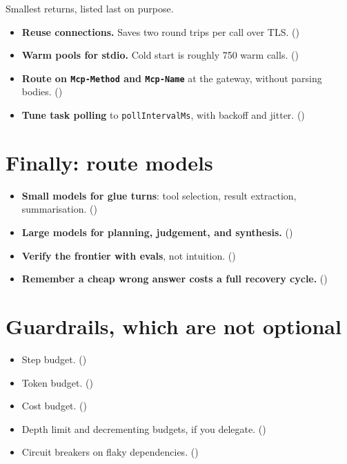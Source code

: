 Smallest returns, listed last on purpose.

\begin{itemize}[leftmargin=1.6em, itemsep=3pt]
\item[$\square$] \textbf{Reuse connections.} Saves two round trips per call over
TLS. ()
\item[$\square$] \textbf{Warm pools for stdio.} Cold start is roughly 750 warm
calls. ()
\item[$\square$] \textbf{Route on \texttt{Mcp-Method} and \texttt{Mcp-Name}} at
the gateway, without parsing bodies. ()
\item[$\square$] \textbf{Tune task polling} to \texttt{pollIntervalMs}, with
backoff and jitter. ()
\end{itemize}

\section{Finally: route models}

\begin{itemize}[leftmargin=1.6em, itemsep=3pt]
\item[$\square$] \textbf{Small models for glue turns}: tool selection, result
extraction, summarisation. ()
\item[$\square$] \textbf{Large models for planning, judgement, and synthesis.}
()
\item[$\square$] \textbf{Verify the frontier with evals}, not intuition.
()
\item[$\square$] \textbf{Remember a cheap wrong answer costs a full recovery
cycle.} ()
\end{itemize}

\section{Guardrails, which are not optional}

\begin{itemize}[leftmargin=1.6em, itemsep=3pt]
\item[$\square$] Step budget. ()
\item[$\square$] Token budget. ()
\item[$\square$] Cost budget. ()
\item[$\square$] Depth limit and decrementing budgets, if you delegate.
()
\item[$\square$] Circuit breakers on flaky dependencies. ()
\end{itemize}


